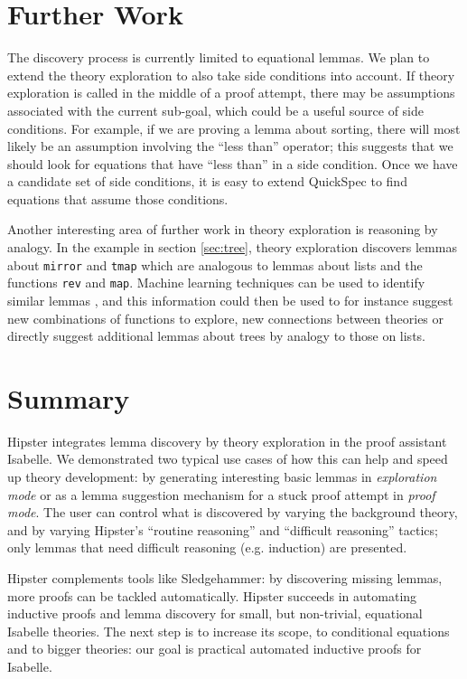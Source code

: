 \section{Further Work}
\label{sec:further}
The discovery process is currently limited to equational lemmas. We
plan to extend the theory exploration to also take side conditions
into account. If theory exploration is called in the middle of a proof
attempt, there may be assumptions associated with the current
sub-goal, which could be a useful source of side conditions. For
example, if we are proving a lemma about sorting, there will most
likely be an assumption involving the ``less than'' operator; this
suggests that we should look for equations that have ``less than'' in
a side condition. Once we have a candidate set of side conditions, it
is easy to extend QuickSpec to find equations that assume those conditions.

Another interesting area of further work in theory exploration is reasoning by analogy. In the example in section \ref{sec:tree}, theory exploration discovers lemmas about \texttt{mirror} and \texttt{tmap} which are analogous to lemmas about lists and the functions \texttt{rev} and \texttt{map}. Machine learning techniques can be used to identify similar lemmas \cite{acl2ml}, and this information could then be used to for instance suggest new combinations of functions to explore, new connections between theories or directly suggest additional lemmas about trees by analogy to those on lists.

\section{Summary}
\label{sec:concl}

Hipster integrates lemma discovery by theory exploration in the proof
assistant Isabelle. We demonstrated two typical use cases of how this
can help and speed up theory development: by generating interesting
basic lemmas in \emph{exploration mode} or as a lemma suggestion
mechanism for a stuck proof attempt in \emph{proof mode}. The user can
control what is discovered by varying the background theory, and by
varying Hipster's ``routine reasoning'' and ``difficult reasoning''
tactics; only lemmas that need difficult reasoning (e.g. induction)
are presented.

Hipster complements tools like Sledgehammer: by discovering missing
lemmas, more proofs can be tackled automatically. Hipster succeeds in
automating inductive proofs and lemma discovery for small, but
non-trivial, equational Isabelle theories. The next step is to
increase its scope, to conditional equations and to bigger theories:
our goal is practical automated inductive proofs for Isabelle.

